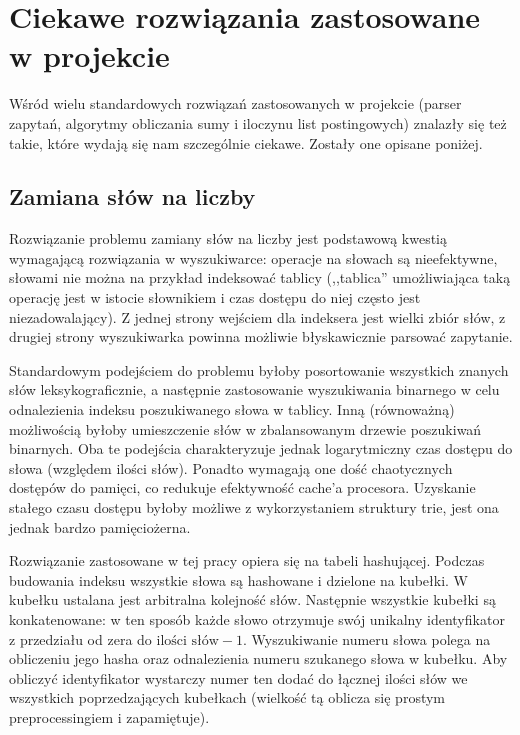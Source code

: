 \documentclass[a4paper,12pt]{article}
\begin{document}
\section{Ciekawe rozwiązania zastosowane w projekcie}
Wśród wielu standardowych rozwiązań zastosowanych w projekcie (parser zapytań,
algorytmy obliczania sumy i iloczynu list postingowych) znalazły się też takie,
które wydają się nam szczególnie ciekawe. Zostały one opisane poniżej.

\subsection{Zamiana słów na liczby}
Rozwiązanie problemu zamiany słów na liczby jest podstawową kwestią wymagającą
rozwiązania w wyszukiwarce: operacje na słowach są nieefektywne, słowami nie
można na przykład indeksować tablicy (,,tablica'' umożliwiająca taką operację
jest w istocie słownikiem i czas dostępu do niej często jest niezadowalający).
Z jednej strony wejściem dla indeksera jest wielki zbiór słów, z drugiej strony
wyszukiwarka powinna możliwie błyskawicznie parsować zapytanie.

Standardowym podejściem do problemu byłoby posortowanie wszystkich znanych słów
leksykograficznie, a następnie zastosowanie wyszukiwania binarnego w celu
odnalezienia indeksu poszukiwanego słowa w tablicy. Inną (równoważną)
możliwością byłoby umieszczenie słów w zbalansowanym drzewie poszukiwań
binarnych. Oba te podejścia charakteryzuje jednak logarytmiczny czas dostępu do
słowa (względem ilości słów). Ponadto wymagają one dość chaotycznych dostępów
do pamięci, co redukuje efektywność cache'a procesora. Uzyskanie stałego czasu
dostępu byłoby możliwe z wykorzystaniem struktury trie, jest ona jednak bardzo
pamięciożerna.

Rozwiązanie zastosowane w tej pracy opiera się na tabeli hashującej.
Podczas budowania indeksu wszystkie słowa są hashowane i dzielone na kubełki.
W kubełku ustalana jest arbitralna kolejność słów. Następnie wszystkie kubełki
są konkatenowane: w ten sposób każde słowo otrzymuje swój unikalny
identyfikator z przedziału od zera do $\text{ilości słów} - 1$. Wyszukiwanie
numeru słowa polega na obliczeniu jego hasha oraz odnalezienia numeru szukanego
słowa w kubełku. Aby obliczyć identyfikator wystarczy numer ten dodać do
łącznej ilości słów we wszystkich poprzedzających kubełkach (wielkość tą
oblicza się prostym preprocessingiem i zapamiętuje).
\end{document}
